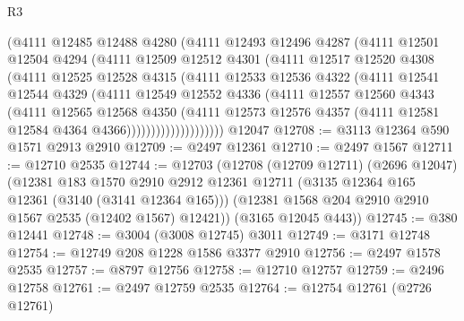 \begin{lexlean}{R3}
\begin{coremodule}
                  (@4111
                    @12485
                    @12488
                    @4280
                    (@4111
                      @12493
                      @12496
                      @4287
                      (@4111
                        @12501
                        @12504
                        @4294
                        (@4111
                          @12509
                          @12512
                          @4301
                          (@4111
                            @12517
                            @12520
                            @4308
                            (@4111
                              @12525
                              @12528
                              @4315
                              (@4111
                                @12533
                                @12536
                                @4322
                                (@4111
                                  @12541
                                  @12544
                                  @4329
                                  (@4111
                                    @12549
                                    @12552
                                    @4336
                                    (@4111
                                      @12557
                                      @12560
                                      @4343
                                      (@4111
                                        @12565
                                        @12568
                                        @4350
                                        (@4111
                                          @12573
                                          @12576
                                          @4357
                                          (@4111 @12581 @12584 @4364 @4366))))))))))))))))))))
    @12047
@12708 := @3113 @12364 @590 @1571 @2913 @2910
@12709 := @2497 @12361
@12710 := @2497 @1567
@12711 := @12710 @2535
@12744 := @12703
    (@12708
      (@12709 @12711)
      (@2696 @12047)
      (@12381
        @183
        @1570
        @2910
        @2912
        @12361
        @12711
        (@3135 @12364 @165 @12361 (@3140 (@3141 @12364 @165)))
        (@12381 @1568 @204 @2910 @2910 @1567 @2535 (@12402 @1567) @12421))
      (@3165 @12045 @443))
@12745 := @380 @12441
@12748 := @3004 (@3008 @12745) @3011
@12749 := @3171 @12748
@12754 := @12749 @208 @1228 @1586 @3377 @2910
@12756 := @2497 @1578 @2535
@12757 := @8797 @12756
@12758 := @12710 @12757
@12759 := @2496 @12758
@12761 := @2497 @12759 @2535
@12764 := @12754 @12761 (@2726 @12761)

\end{coremodule}
\end{lexlean}
